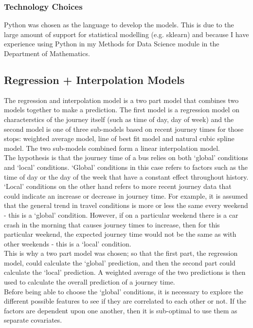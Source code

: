 \subsubsection{Technology Choices}

Python was chosen as the language to develop the models. This is due to the large amount of support for statistical modelling (e.g. sklearn) and because I have experience using Python in my Methods for Data Science module in the Department of Mathematics.

\subsection{Regression + Interpolation Models}

The regression and interpolation model is a two part model that combines two models together to make a prediction. The first model is a regression model on characterstics of the journey itself (such as time of day, day of week) and the second model is one of three sub-models based on recent journey times for those stops: weighted average model, line of best fit model and natural cubic spline model. The two sub-models combined form a linear interpolation model. \\

The hypothesis is that the journey time of a bus relies on both `global' conditions and `local' conditions. `Global' conditions in this case refers to factors such as the time of day or the day of the week that have a constant effect throughout history. `Local' conditions on the other hand refers to more recent journey data that could indicate an increase or decrease in journey time. For example, it is assumed that the general trend in travel conditions is more or less the same every weekend - this is a `global' condition. However, if on a particular weekend there is a car crash in the morning that causes journey times to increase, then for this particular weekend, the expected journey time would not be the same as with other weekends - this is a `local' condition. \\ 

This is why a two part model was chosen; so that the first part, the regression model, could calculate the `global' prediction, and then the second part could calculate the `local' prediction. A weighted average of the two predictions is then used to calculate the overall prediction of a journey time. \\

Before being able to choose the `global' conditions, it is necessary to explore the different possible features to see if they are correlated to each other or not. If the factors are dependent upon one another, then it is sub-optimal to use them as separate covariates. 

